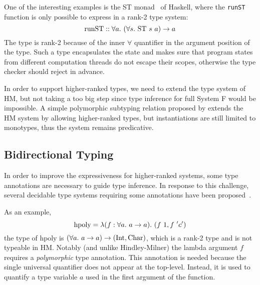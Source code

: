 One of the interesting examples is the ST monad~\citep{94lazyST} of Haskell,
where the \verb|runST| function is only possible to express in a rank-2 type system:
$$\text{runST} :: \all[a]{(\all[s]{\text{ST}~s~a}) \to a}$$
The type is rank-2 because of the inner $\forall$ quantifier
in the argument position of the type.
Such a type encapsulates the state and makes sure
that program states from different computation threads do not escape their scopes,
otherwise the type checker should reject in advance.

In order to support higher-ranked types, we need to extend the type system of HM,
but not taking a too big step since type inference for full System F would be impossible.
A simple polymorphic subtyping relation
proposed by \citet{odersky1996putting}
extends the HM system by allowing higher-ranked types,
but instantiations are still limited to monotypes,
thus the system remains predicative.

\subsection{Bidirectional Typing}

In order to improve the expressiveness for higher-ranked systems,
some type annotations are necessary to guide type inference.
In response to this challenge, several decidable type systems requiring some annotations 
have been proposed~\citep{dunfield2013complete,
jones2007practical,Serrano2018,le2003ml,leijen2008hmf,vytiniotis2008fph}.

As an example,
$$\text{hpoly} = \lam[(f:\all a \to a)] (f~1, f~'c')$$
the type of $\text{hpoly}$ is $(\all a \to a) \to (\text{Int}, \text{Char})$,
which is a rank-2 type and is not typeable in HM.
Notably (and unlike Hindley-Milner) the lambda argument $f$ requires a
\emph{polymorphic} type annotation.
This annotation is needed because the single universal quantifier
does not appear at the top-level. Instead, it is used to quantify a
type variable $a$ used in the first argument of the function.

